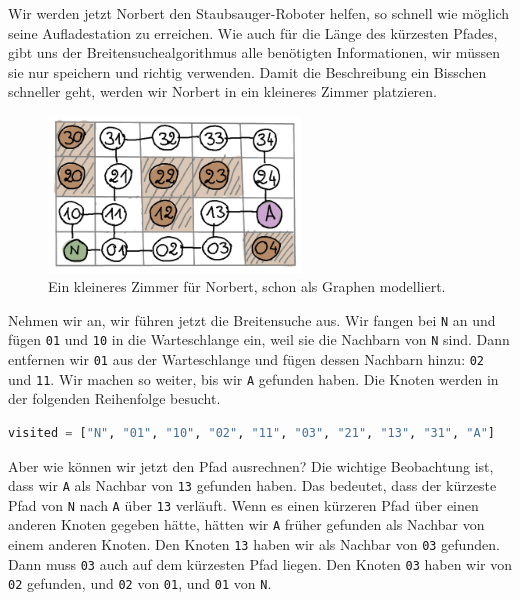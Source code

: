 Wir werden jetzt Norbert den Staubsauger-Roboter helfen, so schnell wie möglich seine Aufladestation zu erreichen. Wie auch für die Länge des kürzesten Pfades, gibt uns der Breitensuchealgorithmus alle benötigten Informationen, wir müssen sie nur speichern und richtig verwenden. Damit die Beschreibung ein Bisschen schneller geht, werden wir Norbert in ein kleineres Zimmer platzieren.
\begin{figure}[H]
    \centering
    \includegraphics[width=0.6\textwidth]{Pictures/SP/norbert_klein_graph.png}
    \caption{Ein kleineres Zimmer für Norbert, schon als Graphen modelliert.}
    \label{fig:norbert_klein_graph}
\end{figure}
Nehmen wir an, wir führen jetzt die Breitensuche aus. Wir fangen bei \texttt{N} an und fügen \texttt{01} und \texttt{10} in die Warteschlange ein, weil sie die Nachbarn von \texttt{N} sind. Dann entfernen wir \texttt{01} aus der Warteschlange und fügen dessen Nachbarn hinzu: \texttt{02} und \texttt{11}. Wir machen so weiter, bis wir \texttt{A} gefunden haben.  Die Knoten werden in der folgenden Reihenfolge besucht.
\begin{lstlisting}[language=Python]
visited = ["N", "01", "10", "02", "11", "03", "21", "13", "31", "A"]
\end{lstlisting}
Aber wie können wir jetzt den Pfad ausrechnen?
Die wichtige Beobachtung ist, dass wir \texttt{A} als Nachbar von \texttt{13} gefunden haben. Das bedeutet, dass der kürzeste Pfad von \texttt{N} nach \texttt{A} über \texttt{13} verläuft. Wenn es einen kürzeren Pfad über einen anderen Knoten gegeben hätte, hätten wir \texttt{A} früher gefunden als Nachbar von einem anderen Knoten. Den Knoten \texttt{13} haben wir als Nachbar von \texttt{03} gefunden. Dann muss \texttt{03} auch auf dem kürzesten Pfad liegen. Den Knoten \texttt{03} haben wir von \texttt{02} gefunden, und \texttt{02} von \texttt{01}, und \texttt{01} von \texttt{N}.

